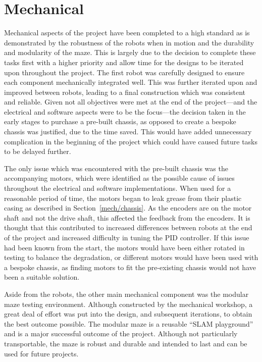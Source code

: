\section{Mechanical}\label{eval/mech}
Mechanical aspects of the project have been completed to a
high standard as is demonstrated by the robustness of the robots when in
motion and the durability and modularity of the maze. This is largely due to the
decision to complete these tasks first with a higher priority and allow time for the
designs to be iterated upon throughout the project. The first robot was carefully
designed to ensure each component mechanically integrated well. This was further
iterated upon and improved between robots, leading to a final construction which was
consistent and reliable. Given not all objectives were met at the end of the project---and the electrical and software aspects were to be the focus---the decision taken in the
early stages to purchase a pre-built chassis, as opposed to create a bespoke chassis
was justified, due to the time saved. This would have added unnecessary complication
in the beginning of the project which could have caused future
tasks to be delayed further.

The only issue which was encountered with the pre-built chassis was the
accompanying motors, which were identified as the possible cause of
issues throughout the electrical and software implementations. When used
for a reasonable period of time, the motors began to leak grease from
their plastic casing as described in Section~\ref{mech/chassis}. As the
encoders are on the motor shaft and not the drive shaft, this affected
the feedback from the encoders. It is thought that this contributed to
increased differences between robots at the end of the project and
increased difficulty in tuning the PID controller. If this issue
had been known from the start, the motors would have been either rotated
in testing to balance the degradation, or different motors would have
been used with a bespoke chassis, as finding motors to fit the pre-existing
chassis would not have been a suitable solution.

Aside from the robots, the other main mechanical component was the modular maze
testing environment. Although constructed by the mechanical workshop, a great deal of
effort was put into the design, and subsequent iterations, to obtain the best outcome
possible. The modular maze is a reusable ``SLAM playground'' and is a major
successful outcome of the project. Although not particularly transportable, the maze
is robust and durable and intended to last and can be used for future projects.

